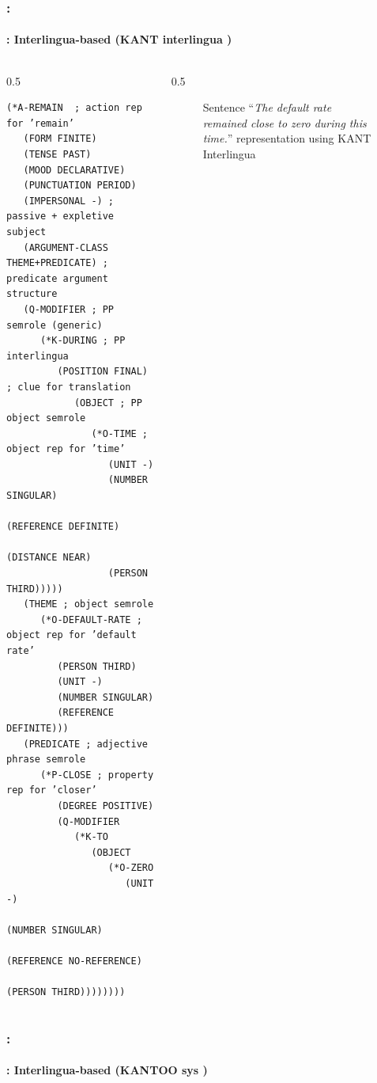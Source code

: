\documentclass[xcolor=table]{beamer}
\begin{document}
\begin{frame}[fragile]
	\frametitle{\insertshortsubtitle: \insertsection}
	\framesubtitle{\insertsubsection: Interlingua-based (KANT interlingua \cite{98-czuba-al})}
	
	\begin{columns}
	\begin{column}{0.5\textwidth}
	\bfseries\fontsize{4}{5}\selectfont
\begin{verbatim}
(*A-REMAIN  ; action rep for ’remain’
   (FORM FINITE)
   (TENSE PAST)
   (MOOD DECLARATIVE)
   (PUNCTUATION PERIOD)
   (IMPERSONAL -) ; passive + expletive subject
   (ARGUMENT-CLASS THEME+PREDICATE) ; predicate argument structure
   (Q-MODIFIER ; PP semrole (generic)
      (*K-DURING ; PP interlingua
         (POSITION FINAL) ; clue for translation
            (OBJECT ; PP object semrole
               (*O-TIME ; object rep for ’time’
                  (UNIT -)
                  (NUMBER SINGULAR)
                  (REFERENCE DEFINITE)
                  (DISTANCE NEAR)
                  (PERSON THIRD)))))
   (THEME ; object semrole
      (*O-DEFAULT-RATE ; object rep for ’default rate’
         (PERSON THIRD)
         (UNIT -)
         (NUMBER SINGULAR)
         (REFERENCE DEFINITE)))
   (PREDICATE ; adjective phrase semrole
      (*P-CLOSE ; property rep for ’closer’
         (DEGREE POSITIVE)
         (Q-MODIFIER
            (*K-TO
               (OBJECT
                  (*O-ZERO
                     (UNIT -)
                     (NUMBER SINGULAR)
                     (REFERENCE NO-REFERENCE)
                     (PERSON THIRD))))))))
\end{verbatim}
	\end{column}
	\begin{column}{0.5\textwidth}
		\begin{figure}
			\caption{Sentence ``\textit{The default rate remained close to zero during this time.}'' representation using KANT Interlingua \cite{98-czuba-al}}
		\end{figure}
	\end{column}
	\end{columns}

\end{frame}

\begin{frame}[fragile]
	\frametitle{\insertshortsubtitle: \insertsection}
	\framesubtitle{\insertsubsection: Interlingua-based (KANTOO sys \cite{00-nyberg-al})}
	
	
\end{frame}
\end{document}

